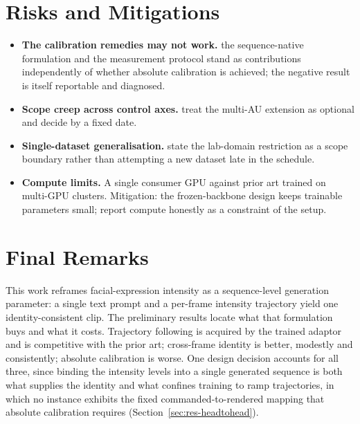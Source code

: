 \section{Risks and Mitigations}\label{sec:sched-risks}

\begin{itemize}
    \item \textbf{The calibration remedies may not work.} the sequence-native formulation and the measurement protocol stand as contributions independently of whether absolute calibration is achieved; the negative result is itself reportable and diagnosed.
    \item \textbf{Scope creep across control axes.} treat the multi-AU extension as optional and decide by a fixed date.
    \item \textbf{Single-dataset generalisation.} state the lab-domain restriction as a scope boundary rather than attempting a new dataset late in the schedule.
    \item \textbf{Compute limits.} A single consumer GPU against prior art trained on multi-GPU clusters. Mitigation: the frozen-backbone design keeps trainable parameters small; report compute honestly as a constraint of the setup.
\end{itemize}

\section{Final Remarks}\label{sec:sched-final}

This work reframes facial-expression intensity as a sequence-level generation parameter: a single
text prompt and a per-frame intensity trajectory yield one identity-consistent clip. The
preliminary results locate what that formulation buys and what it costs. Trajectory following is
acquired by the trained adaptor and is competitive with the prior art; cross-frame identity is
better, modestly and consistently; absolute calibration is worse. One design decision accounts
for all three, since binding the intensity levels into a single generated sequence is both what
supplies the identity and what confines training to ramp trajectories, in which no instance
exhibits the fixed commanded-to-rendered mapping that absolute calibration requires
(Section~\ref{sec:res-headtohead}).


